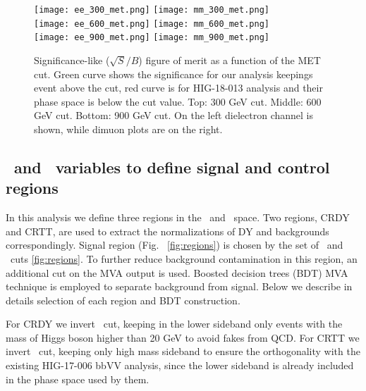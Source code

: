\begin{figure}[H]%
  \begin{center}
    \texttt{[image: ee\_300\_met.png]}
    \texttt{[image: mm\_300\_met.png]}\\
    \texttt{[image: ee\_600\_met.png]}
    \texttt{[image: mm\_600\_met.png]}\\
    \texttt{[image: ee\_900\_met.png]}
    \texttt{[image: mm\_900\_met.png]}\\
    \caption{ Significance-like ($\sqrt{S}/B$) figure of merit as a function of the MET cut. Green curve shows the significance for our analysis keepings event above the cut, red curve is for HIG-18-013 analysis and their phase space is below the cut value. Top: 300 GeV cut. Middle: 600 GeV cut. Bottom: 900 GeV cut. On the left dielectron channel is shown, while dimuon plots are on the right. }
    \label{fig:met_cuts}
  \end{center}
\end{figure}




\subsection{\HBB ~and \ZtoLL ~variables to define signal and control regions}

In this analysis we define three regions in the \HBB ~and \ZtoLL
~space. Two regions, CRDY and CRTT, are used to extract the
normalizations of DY and \ttbar backgrounds correspondingly. Signal region (Fig. ~\ref{fig:regions}) is chosen by
the set of \HBB~and \ZtoLL ~cuts \ref{fig:regions}. To further reduce background contamination in this region, an additional cut on the MVA output is used. Boosted decision trees (BDT) MVA technique is employed to
separate background from signal. Below we describe in details
selection of each region and BDT construction. 

For CRDY we invert \HBB ~cut, keeping in the lower sideband only events
with the mass of Higgs boson higher than 20 GeV to avoid fakes from
QCD. For CRTT we invert \ZtoLL ~cut, keeping only high mass sideband to
ensure the orthogonality with the existing HIG-17-006 bbVV analysis, since the lower sideband is already included in the phase space used by them. 


